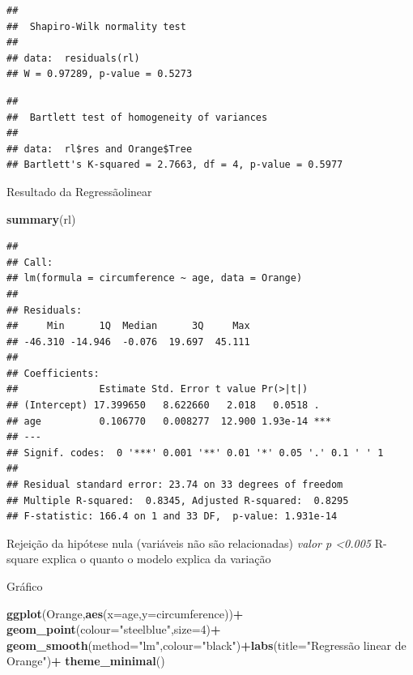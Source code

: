 \documentclass[
]{book}
\newenvironment{Shaded}{\begin{snugshade}}{\end{snugshade}}
\newcommand{\DataTypeTok}[1]{\textcolor[rgb]{0.13,0.29,0.53}{#1}}
\newcommand{\DecValTok}[1]{\textcolor[rgb]{0.00,0.00,0.81}{#1}}
\newcommand{\KeywordTok}[1]{\textcolor[rgb]{0.13,0.29,0.53}{\textbf{#1}}}
\newcommand{\NormalTok}[1]{#1}
\newcommand{\OperatorTok}[1]{\textcolor[rgb]{0.81,0.36,0.00}{\textbf{#1}}}
\newcommand{\StringTok}[1]{\textcolor[rgb]{0.31,0.60,0.02}{#1}}
\begin{document}
\begin{verbatim}
## 
##  Shapiro-Wilk normality test
## 
## data:  residuals(rl)
## W = 0.97289, p-value = 0.5273
\end{verbatim}

\begin{Shaded}
\end{Shaded}

\begin{verbatim}
## 
##  Bartlett test of homogeneity of variances
## 
## data:  rl$res and Orange$Tree
## Bartlett's K-squared = 2.7663, df = 4, p-value = 0.5977
\end{verbatim}

Resultado da Regressãolinear

\begin{Shaded}
\begin{Highlighting}[]
\KeywordTok{summary}\NormalTok{(rl)}
\end{Highlighting}
\end{Shaded}

\begin{verbatim}
## 
## Call:
## lm(formula = circumference ~ age, data = Orange)
## 
## Residuals:
##     Min      1Q  Median      3Q     Max 
## -46.310 -14.946  -0.076  19.697  45.111 
## 
## Coefficients:
##              Estimate Std. Error t value Pr(>|t|)    
## (Intercept) 17.399650   8.622660   2.018   0.0518 .  
## age          0.106770   0.008277  12.900 1.93e-14 ***
## ---
## Signif. codes:  0 '***' 0.001 '**' 0.01 '*' 0.05 '.' 0.1 ' ' 1
## 
## Residual standard error: 23.74 on 33 degrees of freedom
## Multiple R-squared:  0.8345, Adjusted R-squared:  0.8295 
## F-statistic: 166.4 on 1 and 33 DF,  p-value: 1.931e-14
\end{verbatim}

Rejeição da hipótese nula (variáveis não são relacionadas)
\emph{valor p \textless0.005}
R-square explica o quanto o modelo explica da variação

Gráfico

\begin{Shaded}
\begin{Highlighting}[]
\KeywordTok{ggplot}\NormalTok{(Orange,}\KeywordTok{aes}\NormalTok{(}\DataTypeTok{x=}\NormalTok{age,}\DataTypeTok{y=}\NormalTok{circumference))}\OperatorTok{+}\StringTok{ }\KeywordTok{geom_point}\NormalTok{(}\DataTypeTok{colour=}\StringTok{"steelblue"}\NormalTok{,}\DataTypeTok{size=}\DecValTok{4}\NormalTok{)}\OperatorTok{+}
\StringTok{  }\KeywordTok{geom_smooth}\NormalTok{(}\DataTypeTok{method=}\StringTok{"lm"}\NormalTok{,}\DataTypeTok{colour=}\StringTok{"black"}\NormalTok{)}\OperatorTok{+}\KeywordTok{labs}\NormalTok{(}\DataTypeTok{title=}\StringTok{"Regressão linear de Orange"}\NormalTok{)}\OperatorTok{+}
\StringTok{  }\KeywordTok{theme_minimal}\NormalTok{()  }
\end{Highlighting}
\end{Shaded}
\end{document}
